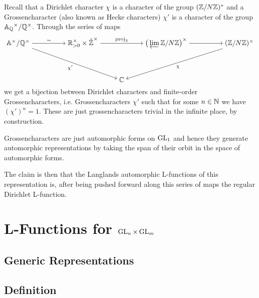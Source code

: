 \begin{example}
	Recall that a Dirichlet character \(\chi\) is a character of the group \((\Z/N\Z)^*\) and a Grossencharacter (also known as Hecke characters) \(\chi'\) is a character of the group \(\A_\Q^\times/\Q^\times\). Through the series of maps 
	\[\begin{tikzcd}[cramped]
		{\A^\times / \Q^\times} && {\R_{>0}^\times \times \hat{\Z}^\times} && {\big(\varprojlim\Z/N\Z\big)^\times } && { (\Z/N\Z)^\times} \\
		\\
		&&& \C
		\arrow["\sim",from=1-1, to=1-3]
		\arrow["{\chi'}"', from=1-1, to=3-4]
		\arrow["{\mathrm{proj}_3}", from=1-3, to=1-5]
		\arrow[from=1-5, to=1-7]
		\arrow["\chi", from=1-7, to=3-4]
	\end{tikzcd}\]
	we get a bijection between Dirichlet characters and finite-order Grossencharacters, i.e. Grossencharacters \(\chi'\) such that for some \(n\in \N\) we have \((\chi')^n = 1\). These are just grossencharacters trivial in the infinite place, by construction.
	
	Grossencharacters are just automorphic forms on \(\operatorname{GL}_1\) and hence they generate automorphic representations by taking the span of their orbit in the space of automorphic forms. 
	
	The claim is then that the Langlands automorphic L-functions of this representation is, after being pushed forward along this series of maps the regular Dirichlet L-function. 
\end{example}



\section{L-Functions for \(\operatorname{GL}_n\times \operatorname{GL}_m\)}
\subsection{Generic Representations}
\subsection{Definition}
\cite{cogdellLECTURESINTEGRALREPRESENTATIONS}

